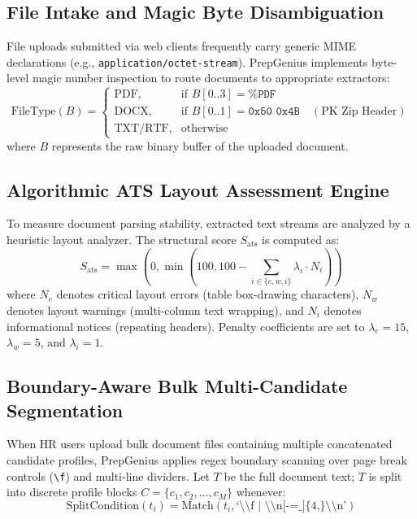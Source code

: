 \documentclass[conference]{IEEEtran}
\begin{document}
\subsection{File Intake and Magic Byte Disambiguation}
File uploads submitted via web clients frequently carry generic MIME declarations (e.g., \texttt{application/octet-stream}). PrepGenius implements byte-level magic number inspection to route documents to appropriate extractors:
\begin{equation}
\text{FileType}(B) = 
\begin{cases} 
\text{PDF}, & \text{if } B[0..3] = \texttt{\%PDF} \\
\text{DOCX}, & \text{if } B[0..1] = \texttt{0x50 0x4B} \quad (\text{PK Zip Header}) \\
\text{TXT/RTF}, & \text{otherwise}
\end{cases}
\end{equation}
where $B$ represents the raw binary buffer of the uploaded document.

\subsection{Algorithmic ATS Layout Assessment Engine}
To measure document parsing stability, extracted text streams are analyzed by a heuristic layout analyzer. The structural score $S_{\text{ats}}$ is computed as:
\begin{equation}
S_{\text{ats}} = \max\left(0, \min\left(100, 100 - \sum_{i \in \{e, w, i\}} \lambda_i \cdot N_i \right)\right)
\end{equation}
where $N_e$ denotes critical layout errors (table box-drawing characters), $N_w$ denotes layout warnings (multi-column text wrapping), and $N_i$ denotes informational notices (repeating headers). Penalty coefficients are set to $\lambda_e = 15$, $\lambda_w = 5$, and $\lambda_i = 1$.

\subsection{Boundary-Aware Bulk Multi-Candidate Segmentation}
When HR users upload bulk document files containing multiple concatenated candidate profiles, PrepGenius applies regex boundary scanning over page break controls (\texttt{\textbackslash f}) and multi-line dividers. Let $T$ be the full document text; $T$ is split into discrete profile blocks $C = \{c_1, c_2, \dots, c_M\}$ whenever:
\begin{equation}
\text{SplitCondition}(t_i) = \text{Match}\left(t_i, \text{`\textbackslash\textbackslash f | \textbackslash\textbackslash n[-=\_]\{4,\}\textbackslash\textbackslash n'}\right)
\end{equation}
\end{document}
